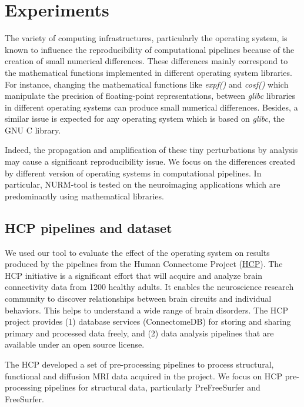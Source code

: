 \documentclass[a4paper,num-refs]{oup-contemporary}
\begin{document}
\section{Experiments}

The variety of computing infrastructures, particularly the operating system, is 
known to influence the reproducibility of computational pipelines because of the
creation of small numerical differences. 
These differences mainly correspond to the mathematical functions implemented 
in different operating system libraries.
For instance, changing the mathematical functions like \emph{expf()} and 
\emph{cosf()} which manipulate the precision of floating-point representations, 
between \emph{glibc} libraries in different operating systems can produce 
small numerical differences.
Besides, a similar issue is expected for any operating system which is 
based on \emph{glibc}, the GNU C library.

Indeed, the propagation and amplification of these tiny perturbations by analysis 
may cause a significant reproducibility issue. We focus on the differences 
created by different version of operating systems in computational pipelines. 
In particular, NURM-tool is tested on the neuroimaging applications which are 
predominantly using mathematical libraries.

\subsection{HCP pipelines and dataset}

We used our tool to evaluate the effect of the operating system on results 
produced by the pipelines from the Human Connectome Project (\href{https://www.humanconnectome.org}{HCP}).
The HCP initiative is a significant effort that will acquire and analyze 
brain connectivity data from 1200 healthy adults.
It enables the neuroscience 
research community to discover relationships between brain circuits and 
individual behaviors. This helps to understand a wide range of brain disorders.
The HCP project provides (1) database services (ConnectomeDB) for storing and 
sharing primary and processed data freely, and (2) data analysis pipelines that 
are available under an open source license.

The HCP developed a set of pre-processing pipelines to process structural,
functional and diffusion MRI data acquired in the project. We focus on HCP
pre-processing pipelines for structural data, particularly PreFreeSurfer
and FreeSurfer. 
\end{document}
